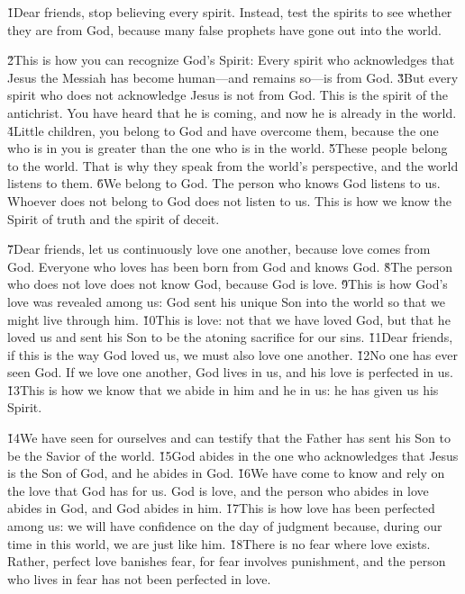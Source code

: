 \v{1}Dear friends, stop believing every spirit. Instead, test the spirits to see whether they are from God, because many false prophets have gone out into the world.

\v{2}This is how you can recognize God's Spirit: Every spirit who acknowledges that Jesus the Messiah has become human---and remains so---is from God. \v{3}But every spirit who does not acknowledge Jesus is not from God. This is the spirit of the antichrist. You have heard that he is coming, and now he is already in the world. \v{4}Little children, you belong to God and have overcome them, because the one who is in you is greater than the one who is in the world. \v{5}These people belong to the world. That is why they speak from the world's perspective, and the world listens to them. \v{6}We belong to God. The person who knows God listens to us. Whoever does not belong to God does not listen to us. This is how we know the Spirit of truth and the spirit of deceit.

\v{7}Dear friends, let us continuously love one another, because love comes from God. Everyone who loves has been born from God and knows God. \v{8}The person who does not love does not know God, because God is love. \v{9}This is how God's love was revealed among us: God sent his unique Son into the world so that we might live through him. \v{10}This is love: not that we have loved God, but that he loved us and sent his Son to be the atoning sacrifice for our sins. \v{11}Dear friends, if this is the way God loved us, we must also love one another. \v{12}No one has ever seen God. If we love one another, God lives in us, and his love is perfected in us. \v{13}This is how we know that we abide in him and he in us: he has given us his Spirit.

\v{14}We have seen for ourselves and can testify that the Father has sent his Son to be the Savior of the world. \v{15}God abides in the one who acknowledges that Jesus is the Son of God, and he abides in God. \v{16}We have come to know and rely on the love that God has for us. God is love, and the person who abides in love abides in God, and God abides in him. \v{17}This is how love has been perfected among us: we will have confidence on the day of judgment because, during our time in this world, we are just like him. \v{18}There is no fear where love exists. Rather, perfect love banishes fear, for fear involves punishment, and the person who lives in fear has not been perfected in love.

